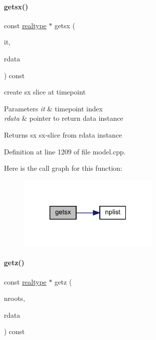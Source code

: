 \paragraph{\texorpdfstring{getsx()}{getsx()}}
{\footnotesize\ttfamily const \mbox{\hyperlink{namespaceamici_a1bdce28051d6a53868f7ccbf5f2c14a3}{realtype}} $\ast$ getsx (\begin{DoxyParamCaption}\item[{const int}]{it,  }\item[{const \mbox{\hyperlink{classamici_1_1_return_data}{Return\+Data}} $\ast$}]{rdata }\end{DoxyParamCaption}) const\hspace{0.3cm}{\ttfamily [protected]}}

create sx slice at timepoint 
\begin{DoxyParams}{Parameters}
{\em it} & timepoint index \\
\hline
{\em rdata} & pointer to return data instance \\
\hline
\end{DoxyParams}
\begin{DoxyReturn}{Returns}
sx sx-\/slice from rdata instance 
\end{DoxyReturn}


Definition at line 1209 of file model.\+cpp.

Here is the call graph for this function\+:
\nopagebreak
\begin{figure}[H]
\begin{center}
\leavevmode
\includegraphics[width=195pt]{classamici_1_1_model_ae808a142aab292ef1b424bc3a0d924a0_cgraph}
\end{center}
\end{figure}
\mbox{\label{classamici_1_1_model_a30571e418f94ca61b8df2b355e46ee1a}} 
\paragraph{\texorpdfstring{getz()}{getz()}}
{\footnotesize\ttfamily const \mbox{\hyperlink{namespaceamici_a1bdce28051d6a53868f7ccbf5f2c14a3}{realtype}} $\ast$ getz (\begin{DoxyParamCaption}\item[{const int}]{nroots,  }\item[{const \mbox{\hyperlink{classamici_1_1_return_data}{Return\+Data}} $\ast$}]{rdata }\end{DoxyParamCaption}) const\hspace{0.3cm}{\ttfamily [protected]}}

